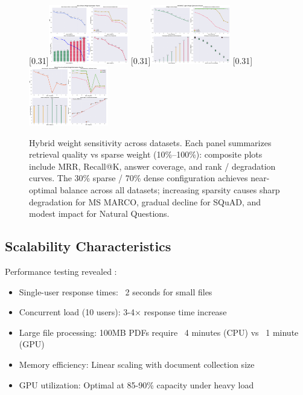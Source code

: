 \documentclass[conference]{IEEEtran}
\begin{document}
\begin{figure}[htbp]
\centering
{}[0.31\textwidth]{\includegraphics[width=0.31\textwidth]{images/evaluation_images/squad_hybrid_optimization.png}}\hfill
{}[0.31\textwidth]{\includegraphics[width=0.31\textwidth]{images/evaluation_images/ms_marco_hybrid_optimization.png}}\hfill
{}[0.31\textwidth]{\includegraphics[width=0.31\textwidth]{images/evaluation_images/natural_questions_hybrid_optimization.png}}
\caption{Hybrid weight sensitivity across datasets. Each panel summarizes retrieval quality vs sparse weight (10\%--100\%): composite plots include MRR, Recall@K, answer coverage, and rank / degradation curves. The 30\% sparse / 70\% dense configuration achieves near-optimal balance across all datasets; increasing sparsity causes sharp degradation for MS MARCO, gradual decline for SQuAD, and modest impact for Natural Questions.}
\label{fig:hybrid_performance}
\end{figure}

\subsection{Scalability Characteristics}

Performance testing revealed \cite{pytorchcuda,johnson2019faiss}:
\begin{itemize}
\item Single-user response times: ~2 seconds for small files
\item Concurrent load (10 users): 3-4× response time increase
\item Large file processing: 100MB PDFs require ~4 minutes (CPU) vs ~1 minute (GPU) \cite{pytorchcuda}
\item Memory efficiency: Linear scaling with document collection size
\item GPU utilization: Optimal at 85-90\% capacity under heavy load
\end{itemize}
\end{document}
